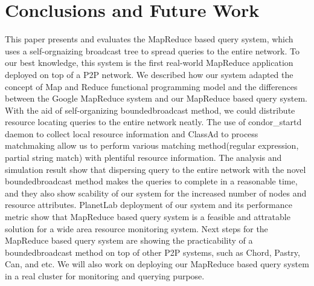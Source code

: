 \documentclass{acm_proc_article-sp}
\begin{document}
\section{Conclusions and Future Work}
This paper presents and evaluates the MapReduce based query system, which uses a self-orgnaizing broadcast tree to spread queries to the entire network.
To our best knowledge, this system is the first real-world MapReduce application deployed on top of a P2P network.
We described how our system adapted the concept of Map and Reduce functional programming model and the differences between the Google MapReduce system and our MapReduce based query system.
With the aid of self-organizing boundedbroadcast method, we could distribute resource locating queries to the entire network neatly. 
The use of condor\_startd daemon to collect local resource information and ClassAd to process matchmaking allow us to perform various matching method(regular expression, partial string match) with plentiful resource information.
The analysis and simulation result show that dispersing query to the entire network with the novel boundedbroadcast method makes the queries to complete in a reasonable time, 
and they also show scability of our system for the increased number of nodes and resource attributes.
PlanetLab deployment of our system and its performance metric show that MapReduce based query system is a feasible and attratable solution for a wide area resource monitoring system.
Next steps for the MapReduce based query system are showing the practicability of a boundedbroadcast method on top of other P2P systems, such as Chord, Pastry, Can, and etc.
We will also work on deploying our MapReduce based query system in a real cluster for monitoring and querying purpose.


\balancecolumns
\end{document}
